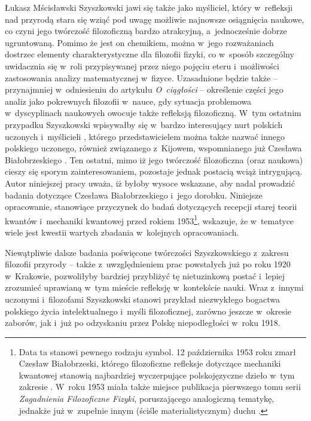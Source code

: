 \begin{artplenv}{Łukasz Mścisławski}
Szyszkowski jawi się także jako myśliciel, który w~refleksji nad przyrodą stara się wziąć pod uwagę możliwie najnowsze osiągnięcia naukowe, co czyni jego twórczość filozoficzną bardzo atrakcyjną, a~jednocześnie dobrze ugruntowaną. Pomimo że jest on chemikiem, można w~jego rozważaniach dostrzec elementy charakterystyczne dla filozofii fizyki, co w~sposób szczególny uwidacznia się w~roli przypisywanej przez niego pojęciu eteru i~możliwości zastosowania analizy matematycznej w~fizyce. Uzasadnione będzie także -- przynajmniej w~odniesieniu do artykułu \textit{O~ciągłości} -- określenie części jego analiz jako pokrewnych filozofii w~nauce, gdy sytuacja problemowa w~dyscyplinach naukowych owocuje także refleksją filozoficzną. W~tym ostatnim przypadku Szyszkowski wpisywałby się w~bardzo interesujący nurt polskich uczonych i~myślicieli
\parencite[zob. np.][]{polak_philosophy_2019}, %
 którego przedstawicielem można także nazwać innego polskiego uczonego, również związanego z~Kijowem, wspomnianego już Czesława Białobrzeskiego 
\parencite[zob. np.][]{mscislawski_miedzy_2017}. %
 Ten ostatni, mimo iż jego twórczość filozoficzna (oraz naukowa) cieszy się sporym zainteresowaniem, pozostaje jednak postacią wciąż intrygującą. Autor niniejszej pracy uważa, iż byłoby wysoce wskazane, aby nadal prowadzić badania dotyczące Czesława Białobrzeskiego i~jego dorobku. Niniejsze opracowanie, stanowiące przyczynek do badań dotyczących recepcji starej teorii kwantów i~mechaniki kwantowej przed rokiem 1953\footnote{Data ta stanowi pewnego rodzaju symbol. 12 października 1953 roku zmarł Czesław Białobrzeski, którego filozoficzne refleksje dotyczące mechaniki kwantowej stanowią najbardziej wyczerpujące polskojęzyczne dzieło w~tym zakresie 
\parencite[][]{bialobrzeski_podstawy_1984}. %
 W~roku 1953 miała także miejsce publikacja pierwszego tomu serii \textit{Zagadnienia Filozoficzne Fizyki}, poruszającego analogiczną tematykę, jednakże już w~zupełnie innym (ściśle materialistycznym) duchu 
\parencite[][]{aleksandrow_zagadnienia_1953}.%
}, wskazuje, że w~tematyce wiele jest kwestii wartych zbadania w~kolejnych opracowaniach.

Niewątpliwie dalsze badania poświęcone twórczości Szyszkowskiego z~zakresu filozofii przyrody -- także z~uwzględnieniem prac powstałych już po roku 1920 w~Krakowie, pozwoliłyby bardziej przybliżyć tę nietuzinkową postać i~lepiej zrozumieć uprawianą w~tym mieście refleksję w~kontekście nauki. Wraz z~innymi uczonymi i~filozofami Szyszkowski stanowi przykład niezwykłego bogactwa polskiego życia intelektualnego i~myśli filozoficznej, zarówno jeszcze w~okresie zaborów, jak i~już po odzyskaniu przez Polskę niepodległości w~roku 1918.

\end{artplenv}